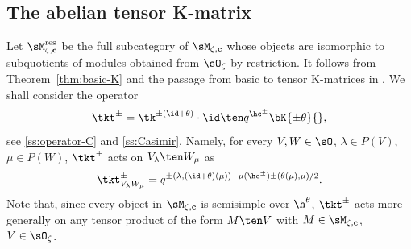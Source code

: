 \documentclass[reqno]{amsart}
\numberwithin{equation}{section}
\begin{document}
\subsection{The abelian tensor K-matrix}\label{eq:tensor-K-thm}
Let $\sM_{\zeta,\mathbf c}^{\mathrm{res}}$ be the full subcategory
of $\sM_{\zeta,\mathbf c}$ whose objects are isomorphic to subquotients
of modules obtained from $\sO_\zeta$ by restriction.
It follows from Theorem~\ref{thm:basic-K} and the passage from basic
to tensor K-matrices in \cite{kolb-20,appel-vlaar-25b,LBG-26}.
We shall consider the operator
\begin{equation}
\tkt^\pm=\tk^{\pm(\id+\theta)}\cdot \id\ten q^{\hc^\pm}\bK{\pm\theta}{},
\end{equation}
see \ref{ss:operator-C} and \ref{ss:Casimir}. Namely, for every $V,W\in\sO$, $\lambda\in P(V)$, $\mu\in P(W)$, $\tkt^\pm$ acts on $V_\lambda\ten W_\mu$ as
\[
\tkt^\pm_{V_\lambda W_\mu}=q^{\pm(\lambda,(\id+\theta)(\mu))+\mu(\hc^\pm)\pm(\theta(\mu),\mu)/2}.
\]
Note that, since every object in $\sM_{\zeta,\mathbf c}$ is semisimple over $\h^\theta$, $\tkt^\pm$
acts more generally on any tensor product of the form $M\ten V$ with $M\in\sM_{\zeta,\mathbf c}$, $V\in\sO_\zeta$.
\end{document}
